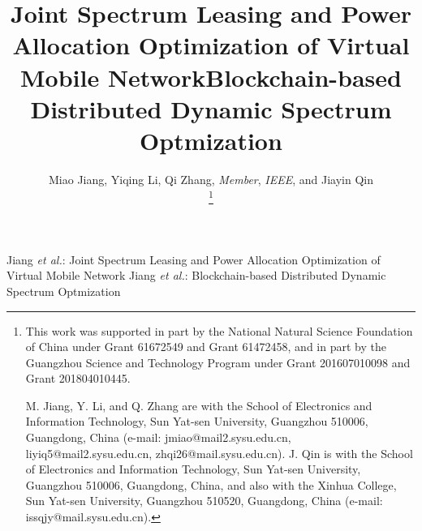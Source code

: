 \documentclass[journal]{IEEEtran}
\begin{document}
	
\title{Joint Spectrum Leasing and Power Allocation Optimization of Virtual Mobile Network}
\title{Blockchain-based Distributed Dynamic Spectrum Optmization}
	
\author{Miao Jiang, Yiqing Li, Qi Zhang, \emph{Member}, \emph{IEEE}, and Jiayin Qin

\thanks{This work was supported in part by the National Natural Science Foundation of China under Grant 61672549 and Grant 61472458, and in part by the Guangzhou Science and Technology Program under Grant 201607010098 and Grant 201804010445.

M. Jiang, Y. Li, and Q. Zhang are with the School of Electronics and Information Technology, Sun Yat-sen University, Guangzhou 510006, Guangdong, China (e-mail: jmiao@mail2.sysu.edu.cn, liyiq5@mail2.sysu.edu.cn, zhqi26@mail.sysu.edu.cn). J. Qin is with the School of Electronics and
Information Technology, Sun Yat-sen University, Guangzhou 510006, Guangdong,  China, and also with the Xinhua College, Sun Yat-sen University, Guangzhou 510520, Guangdong, China (e-mail: issqjy@mail.sysu.edu.cn). }
}%
	
	
{Jiang \MakeLowercase{\textit{et al.}}: Joint Spectrum Leasing and Power Allocation Optimization of Virtual Mobile Network}
{Jiang \MakeLowercase{\textit{et al.}}: Blockchain-based Distributed Dynamic Spectrum Optmization}
	
\end{document}
